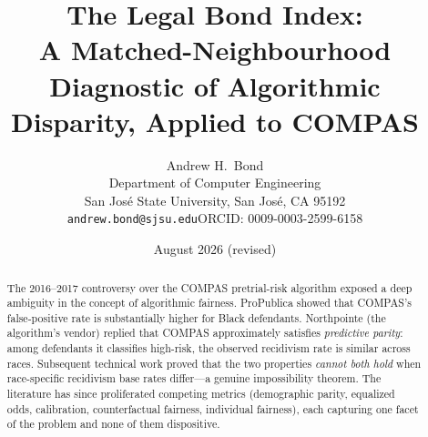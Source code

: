 \documentclass[11pt]{article}
\title{\bfseries The Legal Bond Index:\\
A Matched-Neighbourhood Diagnostic of Algorithmic\\
Disparity, Applied to COMPAS}
\author{Andrew H.\ Bond\\
Department of Computer Engineering\\
San Jos\'{e} State University, San Jos\'{e}, CA 95192\\
\texttt{andrew.bond@sjsu.edu}\quad ORCID: 0009-0003-2599-6158}
\date{August 2026 (revised)}
\begin{document}
\maketitle

\begin{abstract}
\noindent
The 2016--2017 controversy over the COMPAS pretrial-risk algorithm
exposed a deep ambiguity in the concept of algorithmic fairness.
ProPublica showed that COMPAS's false-positive rate is substantially
higher for Black defendants. Northpointe (the algorithm's vendor)
replied that COMPAS approximately satisfies \emph{predictive parity}:
among defendants it classifies high-risk, the observed recidivism rate
is similar across races. Subsequent technical work
\citep{chouldechova2017,kleinberg2017} proved that the two properties
\emph{cannot both hold} when race-specific recidivism base rates
differ---a genuine impossibility theorem. The literature has since
proliferated competing metrics (demographic parity, equalized odds,
calibration, counterfactual fairness, individual fairness), each
capturing one facet of the problem and none of them dispositive.


\end{abstract}
\end{document}
